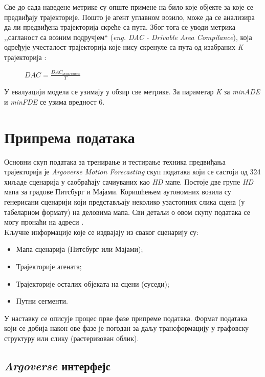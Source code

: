 \documentclass[11pt,oneside]{memoir}
\begin{document}
Све до сада наведене метрике су опште примене на било које објекте за које се предвиђају трајекторије. Пошто је агент углавном возило, може да
се анализира да ли предвиђена трајекторија скреће са пута. Због тога се уводи метрика ,,сагланост са возним подручјем`` 
(\textit{eng. DAC - Drivable Area Compilance}), која одређује учесталост трајекторија које нису скренуле са пута од изабраних 
\textit{K} трајекторија \cite{argoverse}:

\begin{figure}[H]
  \centering
  $DAC = \frac{DAC_{occurences}}{T}$
\end{figure}

У евалуацији модела се узимају у обзир све метрике. За параметар \textit{K} за \textit{minADE} и \textit{minFDE} се узима вредност 6.

\chapter{Припрема података \label{initprep}}

Основни скуп података за тренирање и тестирање техника предвиђања трајекторија је \textit{Argoverse Motion Forecasting} скуп података
који се састоји од 324 хиљаде сценарија у саобраћају сачиуваних као \textit{HD} мапе. Постоје две групе \textit{HD} мапа
за градове Питсбург и Мајами. Коришћењем аутономних возила су генерисани сценарији који представљају неколико узастопних слика сцена (у табеларном формату)
на деловима мапа. Сви детаљи о овом скупу података се могу пронаћи на адреси 
\href{https://www.argoverse.org/index.html}{\color{blue}{www.argoverse.org}} \cite{argoverse}. \\


\noindent Kључне информације које се издвајају из сваког сценарију су:
\begin{itemize}
  \item Мапа сценарија (Питсбург или Мајами);
  \item Трајекторије агената;
  \item Трајекторије осталих објеката на сцени (суседи);
  \item Путни сегменти.
\end{itemize}

У наставку се описује процес прве фазе припреме података. Формат података који се добија након ове фазе је погодан
за даљу трансформацију у графовску структуру или слику (растеризован облик).

\section{\textit{Argoverse} интерфејс}
\end{document}
